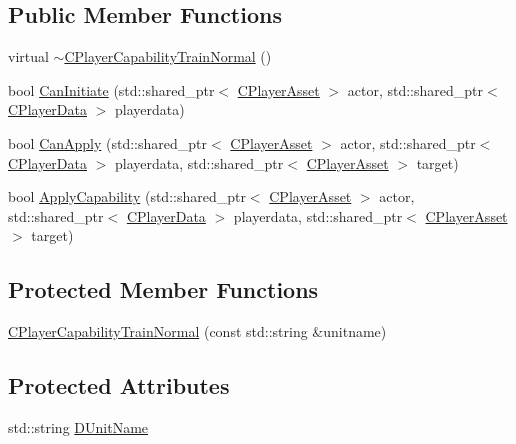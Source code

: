\subsection*{Public Member Functions}
\begin{DoxyCompactItemize}
\item 
virtual \hyperlink{classCPlayerCapabilityTrainNormal_a1cc40f48e17f7e7fab3af09a85b4eb0f}{$\sim$\+C\+Player\+Capability\+Train\+Normal} ()
\item 
bool \hyperlink{classCPlayerCapabilityTrainNormal_ac49cf646b94220844a03b7c3a8a7f215}{Can\+Initiate} (std\+::shared\+\_\+ptr$<$ \hyperlink{classCPlayerAsset}{C\+Player\+Asset} $>$ actor, std\+::shared\+\_\+ptr$<$ \hyperlink{classCPlayerData}{C\+Player\+Data} $>$ playerdata)
\item 
bool \hyperlink{classCPlayerCapabilityTrainNormal_a625d2154bed47357f45662fe5dee7c1b}{Can\+Apply} (std\+::shared\+\_\+ptr$<$ \hyperlink{classCPlayerAsset}{C\+Player\+Asset} $>$ actor, std\+::shared\+\_\+ptr$<$ \hyperlink{classCPlayerData}{C\+Player\+Data} $>$ playerdata, std\+::shared\+\_\+ptr$<$ \hyperlink{classCPlayerAsset}{C\+Player\+Asset} $>$ target)
\item 
bool \hyperlink{classCPlayerCapabilityTrainNormal_a04ed166d2072d44ddc96735ac1beb9bc}{Apply\+Capability} (std\+::shared\+\_\+ptr$<$ \hyperlink{classCPlayerAsset}{C\+Player\+Asset} $>$ actor, std\+::shared\+\_\+ptr$<$ \hyperlink{classCPlayerData}{C\+Player\+Data} $>$ playerdata, std\+::shared\+\_\+ptr$<$ \hyperlink{classCPlayerAsset}{C\+Player\+Asset} $>$ target)
\end{DoxyCompactItemize}
\subsection*{Protected Member Functions}
\begin{DoxyCompactItemize}
\item 
\hyperlink{classCPlayerCapabilityTrainNormal_a80b62a5131937c8230bf6229626dc53c}{C\+Player\+Capability\+Train\+Normal} (const std\+::string \&unitname)
\end{DoxyCompactItemize}
\subsection*{Protected Attributes}
\begin{DoxyCompactItemize}
\item 
std\+::string \hyperlink{classCPlayerCapabilityTrainNormal_aed40686355e78c151910e23ea2d9d32c}{D\+Unit\+Name}
\end{DoxyCompactItemize}
